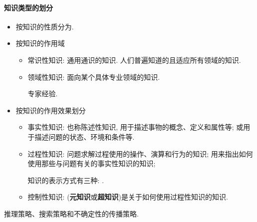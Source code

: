 \paragraph{知识类型的划分 }
\begin{itemize}
\item 按知识的性质分为.
\item 按知识的作用域

\begin{itemize}
   \item  常识性知识: 通用通识的知识. 人们普遍知道的且适应所有领域的知识.
   \item  领域性知识: 面向某个具体专业领域的知识.
   \begin{example}
     专家经验.
   \end{example}
\end{itemize}
\item 按知识的作用效果划分
\begin{itemize}
        \item  事实性知识: 也称陈述性知识, 用于描述事物的概念、定义和属性等; 或用于描述问题的状态、环境和条件等.
        \item  过程性知识: 问题求解过程使用的操作、演算和行为的知识; 用来指出如何使用那些与问题有关的事实性知识的知识;

            知识的表示方式有三种: .

        \item  控制性知识: (\textbf{元知识}或\textbf{超知识})是关于如何使用过程性知识的知识.
       \end{itemize}
\end{itemize}
\begin{example}
    推理策略、搜索策略和不确定性的传播策略.
\end{example}
